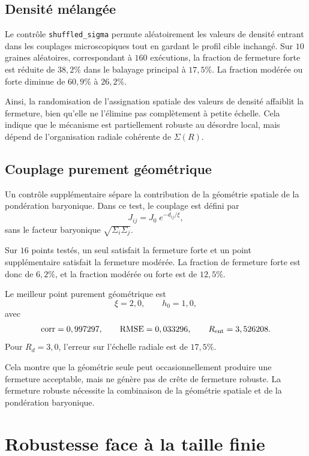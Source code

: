 \documentclass[11pt]{article}
\begin{document}
\subsection{Densité mélangée}

Le contrôle \texttt{shuffled\_sigma} permute aléatoirement les valeurs de densité entrant dans les couplages microscopiques tout en gardant le profil cible inchangé. Sur \(10\) graines aléatoires, correspondant à \(160\) exécutions, la fraction de fermeture forte est réduite de \(38,2\%\) dans le balayage principal à \(17,5\%\). La fraction modérée ou forte diminue de \(60,9\%\) à \(26,2\%\).

Ainsi, la randomisation de l'assignation spatiale des valeurs de densité affaiblit la fermeture, bien qu'elle ne l'élimine pas complètement à petite échelle. Cela indique que le mécanisme est partiellement robuste au désordre local, mais dépend de l'organisation radiale cohérente de \(\Sigma(R)\).

\subsection{Couplage purement géométrique}

Un contrôle supplémentaire sépare la contribution de la géométrie spatiale de la pondération baryonique. Dans ce test, le couplage est défini par
\[
J_{ij} = J_0 \; e^{-d_{ij}/\xi},
\]
sans le facteur baryonique \(\sqrt{\Sigma_i \Sigma_j}\).

Sur \(16\) points testés, un seul satisfait la fermeture forte et un point supplémentaire satisfait la fermeture modérée. La fraction de fermeture forte est donc de \(6,2\%\), et la fraction modérée ou forte est de \(12,5\%\).

Le meilleur point purement géométrique est
\[
\xi = 2{,}0,
\qquad
h_0 = 1{,}0,
\]
avec
\[
\mathrm{corr} = 0,997297,
\qquad
\mathrm{RMSE} = 0,033296,
\qquad
R_{\rm ent} = 3,526208.
\]
Pour \(R_d = 3,0\), l'erreur sur l'échelle radiale est de \(17,5\%\).

Cela montre que la géométrie seule peut occasionnellement produire une fermeture acceptable, mais ne génère pas de crête de fermeture robuste. La fermeture robuste nécessite la combinaison de la géométrie spatiale et de la pondération baryonique.

\section{Robustesse face à la taille finie}
\end{document}
